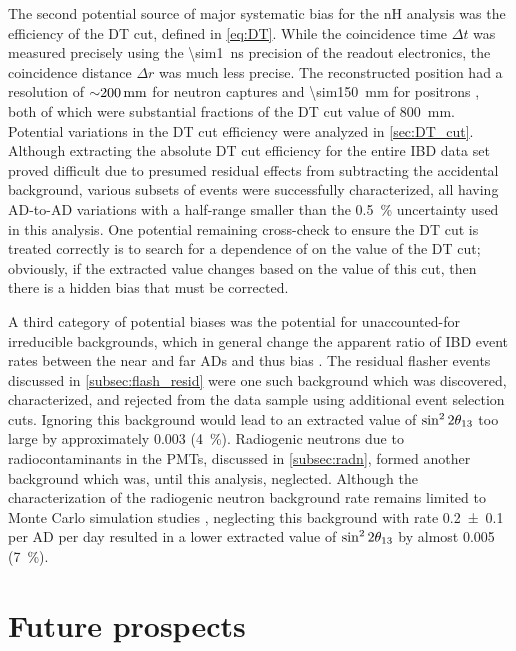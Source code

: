 The second potential source of major systematic bias for the nH analysis
was the efficiency of the DT cut, defined in \cref{eq:DT}.
While the coincidence time $\Delta t$ was measured precisely
using the \SI{\sim1}{\ns} precision of the readout electronics,
the coincidence distance $\Delta r$ was much less precise.
The reconstructed position had a resolution
of $\SI{\sim200}{\mm}$ for neutron captures
and \SI{\sim150}{\mm} for positrons \cite{adsimple1},
both of which were substantial fractions of the DT cut value of \SI{800}{\mm}.
Potential variations in the DT cut efficiency
were analyzed in \cref{sec:DT_cut}.
Although extracting the absolute DT cut efficiency
for the entire IBD data set proved difficult
due to presumed residual effects from subtracting the accidental background,
various subsets of events were successfully characterized,
all having AD-to-AD variations with a half-range smaller than
the \SI{0.5}{\percent} uncertainty used in this analysis.
One potential remaining cross-check to ensure the DT cut is treated correctly
is to search for a dependence of \thetaot{} on the value of the DT cut;
obviously, if the extracted value \thetaot{} changes
based on the value of this cut,
then there is a hidden bias that must be corrected.

A third category of potential biases
was the potential for unaccounted-for irreducible backgrounds,
which in general change the apparent ratio of IBD event rates
between the near and far ADs and thus bias \thetaot{}.
The residual flasher events discussed in \cref{subsec:flash_resid}
were one such background which was discovered, characterized,
and rejected from the data sample using additional event selection cuts.
Ignoring this background would lead to an extracted value of $\sin^22\theta_{13}$
too large by approximately \num{0.003} (\SI{4}{\percent}).
Radiogenic neutrons due to radiocontaminants in the PMTs,
discussed in \cref{subsec:radn},
formed another background which was, until this analysis, neglected.
Although the characterization of the radiogenic neutron background rate
remains limited to Monte Carlo simulation studies \cite{rad_n},
neglecting this background with rate \num{0.2\pm0.1} per AD per day
resulted in a lower extracted value of $\sin^22\theta_{13}$
by almost \num{0.005} (\SI{7}{\percent}).

\section{Future prospects}
\label{sec:future}

